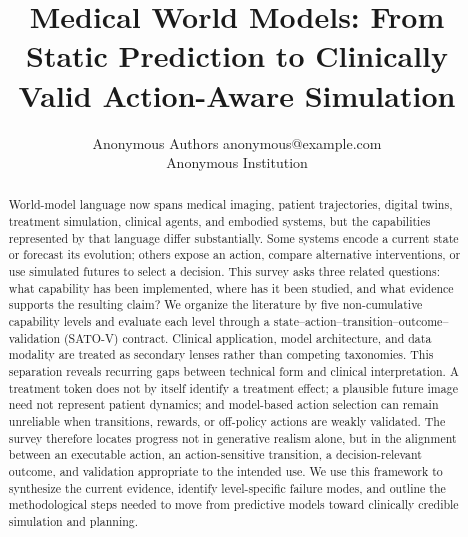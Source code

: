 \documentclass[10pt]{article}
\title{Medical World Models: From Static Prediction to Clinically Valid Action-Aware Simulation}
\author{\name Anonymous Authors \email anonymous@example.com \\
      \addr Anonymous Institution}
\newif\ifworkingdraft
\begin{document}
\maketitle

\begin{abstract}
World-model language now spans medical imaging, patient trajectories, digital twins, treatment simulation, clinical agents, and embodied systems, but the capabilities represented by that language differ substantially. Some systems encode a current state or forecast its evolution; others expose an action, compare alternative interventions, or use simulated futures to select a decision. This survey asks three related questions: what capability has been implemented, where has it been studied, and what evidence supports the resulting claim? We organize the literature by five non-cumulative capability levels and evaluate each level through a state--action--transition--outcome--validation (SATO-V) contract. Clinical application, model architecture, and data modality are treated as secondary lenses rather than competing taxonomies. This separation reveals recurring gaps between technical form and clinical interpretation. A treatment token does not by itself identify a treatment effect; a plausible future image need not represent patient dynamics; and model-based action selection can remain unreliable when transitions, rewards, or off-policy actions are weakly validated. The survey therefore locates progress not in generative realism alone, but in the alignment between an executable action, an action-sensitive transition, a decision-relevant outcome, and validation appropriate to the intended use. We use this framework to synthesize the current evidence, identify level-specific failure modes, and outline the methodological steps needed to move from predictive models toward clinically credible simulation and planning.
\end{abstract}

\ifworkingdraft
  \clearpage
  \tableofcontents
  \clearpage
\fi

















\appendix




\end{document}
